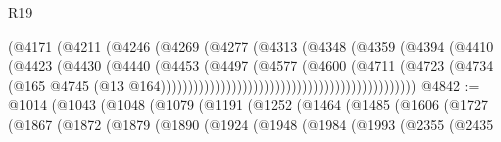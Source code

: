 \begin{lexlean}{R19}
\begin{coremodule}
                                                      (@4171
                                                        (@4211
                                                          (@4246
                                                            (@4269
                                                              (@4277
                                                                (@4313
                                                                  (@4348
                                                                    (@4359
                                                                      (@4394
                                                                        (@4410
                                                                          (@4423
                                                                            (@4430
                                                                              (@4440
                                                                                (@4453
                                                                                  (@4497
                                                                                    (@4577
                                                                                      (@4600
                                                                                        (@4711
                                                                                          (@4723
                                                                                            (@4734
                                                                                              (@165
                                                                                                @4745
                                                                                                (@13
                                                                                                  @164)))))))))))))))))))))))))))))))))))))))))))))))
@4842 := @1014
    (@1043
      (@1048
        (@1079
          (@1191
            (@1252
              (@1464
                (@1485
                  (@1606
                    (@1727
                      (@1867
                        (@1872
                          (@1879
                            (@1890
                              (@1924
                                (@1948
                                  (@1984
                                    (@1993
                                      (@2355
                                        (@2435

\end{coremodule}
\end{lexlean}
